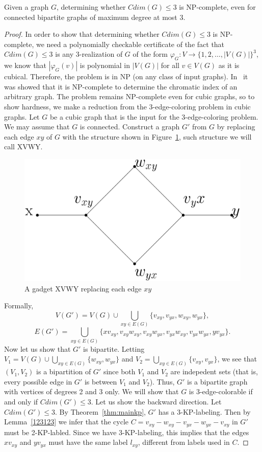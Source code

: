 \documentclass[12pt,a4paper,titlepage,openany]{report}
\begin{document}
\begin{theorem}
Given a graph $G$, determining whether $Cdim(G) \leq 3$ is NP-complete, even for connected bipartite graphs of maximum degree at most 3.
\end{theorem}
\begin{proof}
In order to show that determining whether $Cdim(G) \leq 3$ is NP-complete, we need a polynomially checkable certificate of the fact that $Cdim(G) \leq 3$ is any 3-realization of $G$ of the form $\varphi _G : V \to \{1,2,\ldots, |V(G)|\}^3$, we know that $|\varphi_G(v)|$ is polynomial in $|V(G)|$ for all $v\in V(G)$ as it is cubical. Therefore, the problem is in NP (on any class of input graphs).\newline
In~\cite{Ian} it was showed that it is NP-complete to determine the chromatic index of an arbitrary graph. The problem remains NP-complete even for cubic graphs, so to show hardness, we make a reduction from the 3-edge-coloring problem in cubic graphs.\newline
Let $G$ be a cubic graph that is the input for the
3-edge-coloring problem. We may assume that $G$ is connected. Construct a graph $G'$ from $G$ by replacing each edge $xy$ of $G$ with the structure shown in Figure~\ref{gadget}, such structure we will call XVWY.

\begin{figure}[h]
\begin{center}
\includegraphics[width=0.6\linewidth]{figures/gadget.png}
\end{center}
\caption{A gadget XVWY replacing each edge $xy$}\label{gadget}
\end{figure}
Formally,
$$V(G')= V(G)\cup
\bigcup_{xy\in E(G)} \{v_{xy}, v_{yx}, w_{xy}, w_{yx}\},$$
$$E(G')=\bigcup_{xy\in E(G)} \{xv_{xy}, v_{xy}w_{xy}, v_{xy}w_{yx}, v_{yx}w_{xy},v_{yx}w_{yx}, yv_{yx}\}.$$
Now let us show that $G'$ is bipartite. Letting $V_1=V(G)\cup
\bigcup_{xy\in E(G)} \{w_{xy},w_{yx}\}$ and $V_2=\bigcup_{xy\in E(G)} \{v_{xy},v_{yx}\}$, we see that $(V_1, V_2)$ is a bipartition of $G'$ since both $V_1$ and $V_2$ are indepedent sets (that is, every possible edge in $G'$ is between $V_1$ and $V_2$). Thus, $G'$ is a bipartite graph with vertices of degrees 2 and 3 only. We will show that $G$ is 3-edge-colorable if and only if $Cdim(G') 
\leq 3$.\newline
Let us show the backward direction. Let $Cdim(G')\leq 3$. By Theorem~\ref{thm:mainkp}, $G'$ has a 3-KP-labeling. Then by Lemma~\ref{123123} we infer that the cycle $C=v_{xy}-w_{xy}-v_{yx}-w_{yx}-v_{xy}$ in $G'$ must be 2-KP-labled. Since we have 3-KP-labeling, this implies that the edges $xv_{xy}$ and $yv_{yx}$ must have the same label $l_{xy}$, different from labels used in $C$.


\end{proof}
\end{document}

